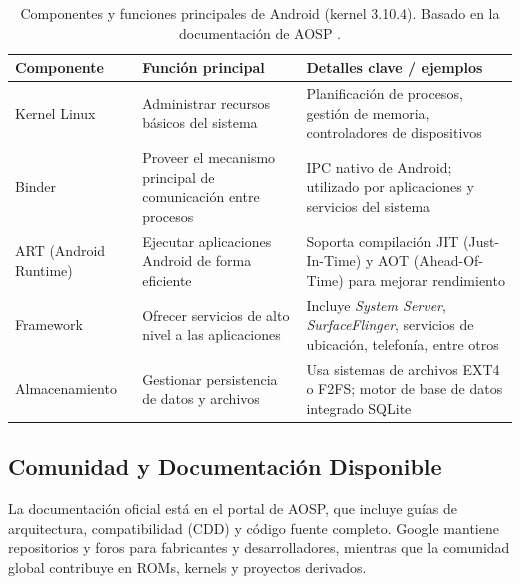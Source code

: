 \begin{table}[H]
\centering
\begin{tabular}{p{3.2cm}p{5cm}p{6cm}}
\hline
\textbf{Componente} & \textbf{Función principal} & \textbf{Detalles clave / ejemplos} \\
\hline
Kernel Linux & Administrar recursos básicos del sistema & Planificación de procesos, gestión de memoria, controladores de dispositivos \\
\hline
Binder & Proveer el mecanismo principal de comunicación entre procesos & IPC nativo de Android; utilizado por aplicaciones y servicios del sistema \parencite{aosp-docs} \\
\hline
ART (Android Runtime) & Ejecutar aplicaciones Android de forma eficiente & Soporta compilación JIT (Just-In-Time) y AOT (Ahead-Of-Time) para mejorar rendimiento \\
\hline
Framework & Ofrecer servicios de alto nivel a las aplicaciones & Incluye \textit{System Server}, \textit{SurfaceFlinger}, servicios de ubicación, telefonía, entre otros \\
\hline
Almacenamiento & Gestionar persistencia de datos y archivos & Usa sistemas de archivos EXT4 o F2FS; motor de base de datos integrado SQLite \\
\hline
\end{tabular}
\caption[Componentes y funciones clave de Android]{Componentes y funciones principales de Android (kernel 3.10.4). Basado en la documentación de AOSP \parencite{aosp-docs}.}
\label{tab:componentes-android}
\end{table}


\subsection{Comunidad y Documentación Disponible}
La documentación oficial está en el portal de AOSP, 
que incluye guías de arquitectura, compatibilidad (CDD) y código fuente completo.  
Google mantiene repositorios y foros para fabricantes y desarrolladores, 
mientras que la comunidad global contribuye en ROMs, kernels y proyectos derivados.